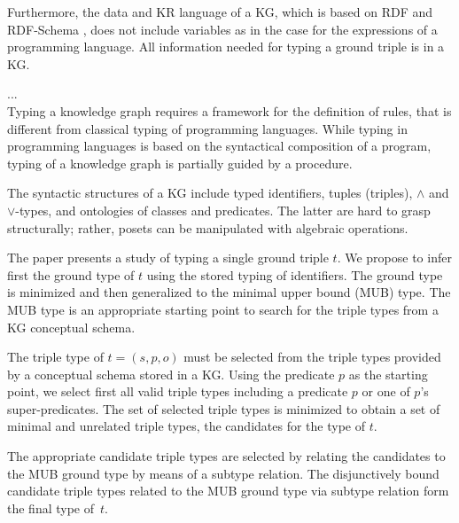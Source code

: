 \documentclass[runningheads]{llncs}
\begin{document}
Furthermore, the data and KR language of a KG, which is based on RDF
and RDF-Schema \cite{rdf,rdfschema}, does not include variables as in
the case for the expressions of a programming language. All
information needed for typing a ground triple is in a KG.

... \\

Typing a knowledge graph requires a framework for the definition of
rules, that is different from classical typing of programming
languages. While typing in programming languages is based on the
syntactical composition of a program, typing of a knowledge graph is
partially guided by a procedure.

The syntactic structures of a KG include typed identifiers, tuples
(triples), $\land$ and $\lor$-types, and ontologies of classes and
predicates. The latter are hard to grasp structurally; rather, posets
can be manipulated with algebraic operations.

The paper presents a study of typing a single ground triple $t$. We
propose to infer first the ground type of $t$ using the stored typing
of identifiers. The ground type is minimized and then generalized to
the minimal upper bound (MUB) type. The MUB type is an appropriate
starting point to search for the triple types from a KG conceptual
schema.

The triple type of $t=(s,p,o)$ must be selected from the triple types
provided by a conceptual schema stored in a KG. Using the predicate
$p$ as the starting point, we select first all valid triple types
including a predicate $p$ or one of $p$'s super-predicates. The set of
selected triple types is minimized to obtain a set of minimal and
unrelated triple types, the candidates for the type of $t$.

The appropriate candidate triple types are selected by relating the
candidates to the MUB ground type by means of a subtype relation. The
disjunctively bound candidate triple types related to the MUB ground
type via subtype relation form the final type of~$t$.
\end{document}
